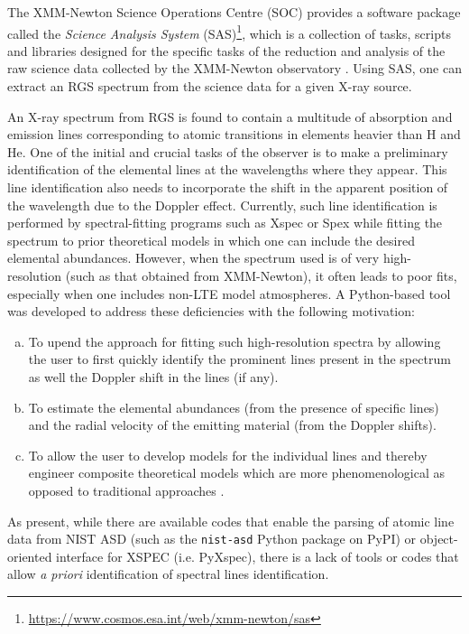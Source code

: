         The XMM-Newton Science Operations Centre (SOC) provides a software package called the \textit{Science Analysis System} (SAS)\footnote{\url{https://www.cosmos.esa.int/web/xmm-newton/sas}}, which is a collection of tasks, scripts and libraries designed for the specific tasks of the reduction and analysis of the raw science data collected by the XMM-Newton observatory \cite{de2019users}. Using SAS, one can extract an RGS spectrum from the science data for a given X-ray source.
        
        An X-ray spectrum from RGS is found to contain a multitude of absorption and emission lines corresponding to atomic transitions in elements heavier than H and He. One of the initial and crucial tasks of the observer is to make a preliminary identification of the elemental lines at the wavelengths where they appear. This line identification also needs to incorporate the shift in the apparent position of the wavelength due to the Doppler effect. Currently, such line identification is performed by spectral-fitting programs such as Xspec or Spex while fitting the spectrum to prior theoretical models in which one can include the desired elemental abundances. However, when the spectrum used is of very high-resolution (such as that obtained from XMM-Newton), it often leads to poor fits, especially when one includes non-LTE model atmospheres. A Python-based tool was developed to address these deficiencies with the following motivation:
        \begin{enumerate}[a)]
            \item To upend the approach for fitting such high-resolution spectra by allowing the user to first quickly identify the prominent lines present in the spectrum as well the Doppler shift in the lines (if any).
            \item To estimate the elemental abundances (from the presence of specific lines) and the radial velocity of the emitting material (from the Doppler shifts).
            \item To allow the user to develop models for the individual lines and thereby engineer composite theoretical models which are more phenomenological as opposed to traditional approaches \cite{ness2020complications}.
        \end{enumerate}
        As present, while there are available codes that enable the parsing of atomic line data from NIST ASD (such as the \texttt{nist-asd} Python package on PyPI) or object-oriented interface for XSPEC (i.e. PyXspec), there is a lack of tools or codes that allow \textit{a priori} identification of spectral lines identification.
        
